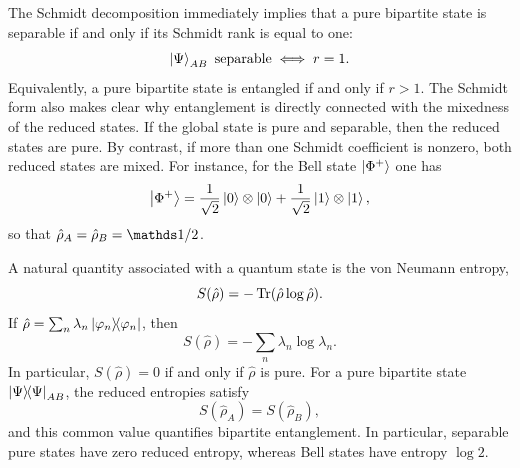 The Schmidt decomposition immediately implies that a pure bipartite state is separable if and only if its Schmidt rank is equal to one:
\begin{equation}
	\ket{\Psi}_{AB}\ \text{separable}
	\iff
	r=1.
	\label{eq:intro_qm_schmidt_rank_one_separable}
\end{equation}
Equivalently, a pure bipartite state is entangled if and only if $r>1$. The Schmidt form also makes clear why entanglement is directly connected with the mixedness of the reduced states. If the global state is pure and separable, then the reduced states are pure. By contrast, if more than one Schmidt coefficient is nonzero, both reduced states are mixed. For instance, for the Bell state $\ket{\Phi^+}$ one has
\begin{equation}
	\ket{\Phi^+}
	=
	\frac{1}{\sqrt{2}}\ket{0}\otimes\ket{0}
	+
	\frac{1}{\sqrt{2}}\ket{1}\otimes\ket{1},
	\label{eq:intro_qm_bell_state_schmidt_form}
\end{equation}
so that $\hat \rho_A=\hat \rho_B=\id/2$.

A natural quantity associated with a quantum state is the von Neumann entropy,
\begin{equation}
	S(\hat \rho)=-\Tr(\hat \rho \log \hat \rho).
	\label{eq:intro_qm_von_neumann_entropy}
\end{equation}
If $\hat \rho=\sum_n \lambda_n \dyad{\varphi_n}{\varphi_n}$, then
\begin{equation}
	S(\hat \rho)=-\sum_n \lambda_n \log \lambda_n.
	\label{eq:intro_qm_von_neumann_entropy_spectral_form}
\end{equation}
In particular, $S(\hat \rho)=0$ if and only if $\hat \rho$ is pure. For a pure bipartite state $\dyad{\Psi}{\Psi}_{AB}$, the reduced entropies satisfy
\begin{equation}
	S(\hat \rho_A)=S(\hat \rho_B),
	\label{eq:intro_qm_equal_reduced_entropies_pure_bipartite}
\end{equation}
and this common value quantifies bipartite entanglement. In particular, separable pure states have zero reduced entropy, whereas Bell states have entropy $\log 2$.


